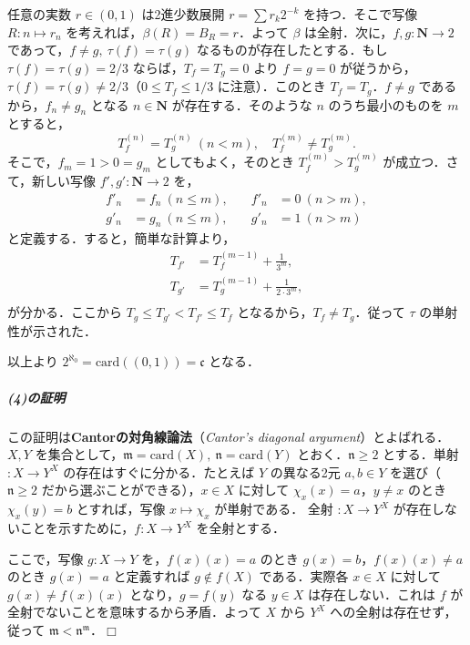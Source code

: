 \documentclass[b5paper,pandoc]{bxjsarticle}
\let\oldsubparagraph\subparagraph
\renewcommand{\subparagraph}[1]{\oldsubparagraph{#1}\mbox{}}
\begin{document}
任意の実数 \(r \in (0, 1)\) は2進少数展開 \(r = \sum r_k 2^{-k}\)
を持つ．そこで写像 \(R \colon n \mapsto r_n\)
を考えれば，\(\beta(R) = B_R = r\)．よって \(\beta\)
は全射．次に，\(f, g \colon \boldsymbol N \to 2\)
であって，\(f \neq g,\ \tau(f) = \tau(g)\)
なるものが存在したとする．もし \(\tau(f) = \tau(g) = 2/3\)
ならば，\(T_f = T_g = 0\) より \(f = g = 0\)
が従うから，\(\tau(f) = \tau(g) \neq 2/3\)（\(0 \leqslant T_f \leqslant 1/3\)
に注意）．このとき \(T_f = T_g\)．\(f \neq g\)
であるから，\(f_n \neq g_n\) となる \(n \in \boldsymbol N\)
が存在する．そのような \(n\) のうち最小のものを \(m\) とすると， \[
T_f^{(n)} = T_g^{(n)} \ (n \lt m), \quad T_f^{(m)} \neq T_g^{(m)}.
\] そこで，\(f_m = 1 \gt 0 = g_m\) としてもよく，そのとき
\(T_f^{(m)} \gt T_g^{(m)}\) が成立つ．さて，新しい写像
\(f', g' \colon \boldsymbol N \to 2\) を， \begin{align*}
f'_n &= f_n \ (n \leqslant m), &\quad f'_n &= 0 \ (n \gt m),\\
g'_n &= g_n \ (n \leqslant m), &\quad g'_n &= 1 \ (n \gt m)
\end{align*} と定義する．すると，簡単な計算より， \begin{align*}
T_{f'} &= T_f^{(m - 1)} + \frac 1{3^m},\\
T_{g'} &= T_g^{(m - 1)} + \frac 1{2 \cdot 3^m},\\
\end{align*} が分かる．ここから
\(T_g \leqslant T_{g'} \lt T_{f'} \leqslant T_f\)
となるから，\(T_f \neq T_g\)．従って \(\tau\) の単射性が示された．

以上より \(2^{\aleph_0} = \mathrm{card}((0, 1)) = \mathfrak c\) となる．

\hypertarget{ux306eux8a3cux660e-3}{%
\subparagraph{(4)の証明}\label{ux306eux8a3cux660e-3}}

この証明は\textbf{Cantorの対角線論法}（\emph{Cantor's diagonal
argument}）とよばれる．\(X, Y\)
を集合として，\(\mathfrak m = \mathrm{card}(X),\ \mathfrak n = \mathrm{card}(Y)\)
とおく．\(\mathfrak n \geqslant 2\) とする．単射 \(\colon X \to Y^X\)
の存在はすぐに分かる．たとえば \(Y\) の異なる2元 \(a, b \in Y\)
を選び（\(\mathfrak n \geqslant 2\)
だから選ぶことができる），\(x \in X\) に対して
\(\chi_x(x) = a\)，\(y \neq x\) のとき \(\chi_x(y) = b\) とすれば，写像
\(x \mapsto \chi_x\) が単射である． 全射 \(\colon X \to Y^X\)
が存在しないことを示すために，\(f \colon X \to Y^X\) を全射とする．

ここで，写像 \(g \colon X \to Y\) を，\(f(x)(x) = a\) のとき
\(g(x) = b\)，\(f(x)(x) \neq a\) のとき \(g(x) = a\) と定義すれば
\(g \notin f(X)\) である．実際各 \(x \in X\) に対して
\(g(x) \neq f(x)(x)\) となり，\(g = f(y)\) なる \(y \in X\)
は存在しない．これは \(f\) が全射でないことを意味するから矛盾．よって
\(X\) から \(Y^X\) への全射は存在せず，従って
\(\mathfrak m \lt \mathfrak n^{\mathfrak m}\)．\(\Box\)
\end{document}
